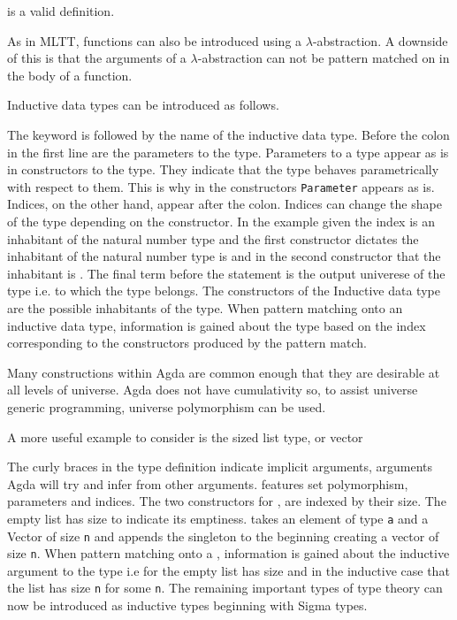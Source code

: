 is a valid definition.

As in MLTT, functions can also be introduced using a $\lambda$-abstraction. A
downside of this is that the arguments of a $\lambda$-abstraction can not be
pattern matched on in the body of a function.


Inductive data types can be introduced as follows.


The  keyword is followed by the name of the inductive data
type. Before the colon in the first line are the parameters to the type.
Parameters to a type appear as is in constructors to the type. They indicate
that the type behaves parametrically with respect to them. This is why in the
constructors \verb|Parameter| appears as is. Indices, on the other hand, appear
after the colon. Indices can change the shape of the type depending on the
constructor. In the example given the index is an inhabitant of the natural
number type and the first constructor dictates the inhabitant of the natural
number type is  and in the second constructor that
the inhabitant is . The final term before the
 statement is the output univerese of the type i.e. to which
 the type belongs. The constructors of the Inductive data type
are the possible inhabitants of the type. When pattern matching onto an
inductive data type, information is gained about the type based on the index
corresponding to the constructors produced by the pattern match.

Many constructions within Agda are common enough that they are desirable at all
levels of universe. Agda does not have cumulativity so, to assist universe
generic programming, universe polymorphism can be used.


A more useful example to consider is the sized list type, or vector


The curly braces in the type definition indicate implicit arguments, arguments
Agda will try and infer from other arguments.  features set
polymorphism, parameters and indices. The two constructors for
, are indexed by their size. The empty list has size
 to indicate its emptiness.
takes an element of type \verb|a| and a Vector of size \verb|n| and appends the
singleton to the beginning creating a vector of size
 \verb|n|. When pattern matching onto a
, information is gained about the inductive argument to the
type i.e for the empty list has size  and in the
inductive case that the list has size  \verb|n|
for some \verb|n|. The remaining important types of \mlt{} type theory can
now be introduced as inductive types beginning with Sigma types.

